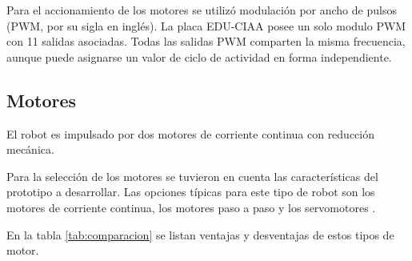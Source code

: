 Para el accionamiento de los motores se utilizó modulación por ancho de pulsos (PWM, por su sigla en inglés). La placa EDU-CIAA posee un solo modulo PWM con 11 salidas asociadas. Todas las salidas PWM comparten la misma frecuencia, aunque puede asignarse un valor de ciclo de actividad en forma independiente.

%


\subsection{Motores}

El robot es impulsado por dos motores de corriente continua con reducción mecánica.

Para la selección de los motores se tuvieron en cuenta las características del prototipo a desarrollar. 
Las opciones típicas para este tipo de robot son los motores de corriente continua, los motores paso a paso y los servomotores \citep{servo}. 


En la tabla \ref{tab:comparacion} se listan ventajas y desventajas de estos tipos de motor.

